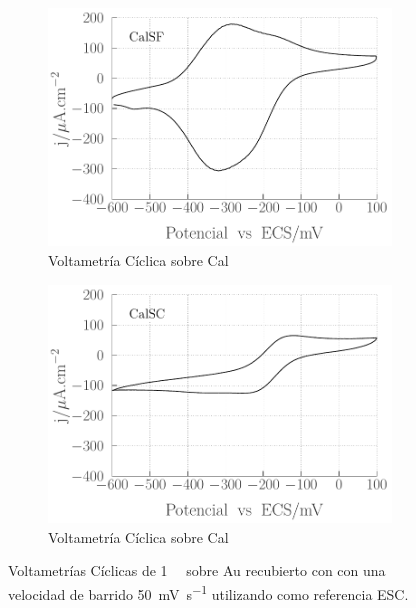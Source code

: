 						\begin{figure}[th]
				 	   	    \begin{subfigure}[t]{0.495\textwidth}
				        	\includegraphics[width=\textwidth]{Graficos/SF-accesibilidad.pdf}
				       		\caption{Voltametría Cíclica sobre Cal\pdmF}
				         	\end{subfigure}
				         	\begin{subfigure}[t]{0.495\textwidth}
				        	\includegraphics[width=\textwidth]{Graficos/SC-accesibilidad.pdf}
				       		\caption{Voltametría Cíclica sobre Cal\pdmC}
				         	\end{subfigure}
				     		\caption[Accesibilidad electrodo de trabajo.]{Voltametrías Cíclicas de \aminorutenio\space \SI{1}{\milli\Molar} sobre Au recubierto con \pdm\space con una velocidad de barrido \SI{50}{\milli\volt\per\second} utilizando como referencia ESC.}
				     		\label{fig:accesibilidad}
				     		\end{figure}
	
